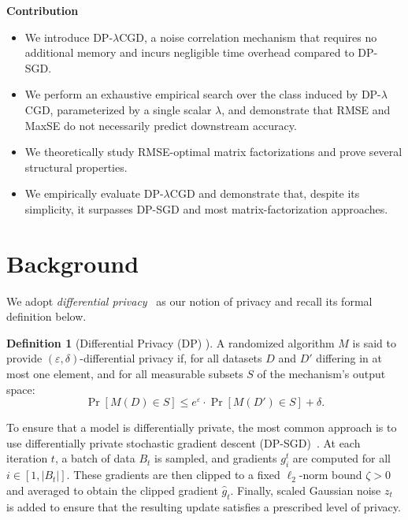\documentclass{article}
\theoremstyle{plain}
\theoremstyle{definition}
\newtheorem{definition}{Definition}   %
\theoremstyle{remark}
\newcommand{\method}{DP-$\lambda$CGD\xspace}
\begin{document}
\textbf{Contribution}

\begin{itemize}[nosep]
    \item We introduce \method, a noise correlation mechanism that requires no additional memory and incurs negligible time overhead compared to DP-SGD.
    \smallskip\item We perform an exhaustive empirical search over the class induced by \method, parameterized by a single scalar $\lambda$, and demonstrate that RMSE and MaxSE do not necessarily predict downstream accuracy.
    \smallskip\item We theoretically study RMSE-optimal matrix factorizations and prove several structural properties.
    \smallskip\item We empirically evaluate \method and demonstrate that, despite its simplicity, it surpasses DP-SGD and most matrix-factorization approaches.
\end{itemize}





\section{Background}



We adopt \emph{differential privacy}~\citep{Dwork_DP_original} as our notion of privacy and recall its formal definition below.


\begin{definition}[Differential Privacy (DP) \citep{Dwork_DP_original}]
A randomized algorithm $M$ is said to provide $(\varepsilon, \delta)$-differential privacy if, for all datasets $D$ and $D'$ differing in at most one element, and for all measurable subsets $S$ of the mechanism's output space:
\begin{equation}
\Pr[M(D) \in S] \leq e^{\varepsilon} \cdot \Pr[M(D') \in S] + \delta.
\end{equation}
\end{definition}



To ensure that a model is differentially private, the most common approach is to use differentially private stochastic gradient descent (DP-SGD)~\citep{Abadi}. At each iteration $t$, a batch of data $B_t$ is sampled, and gradients
$g_i^t$ are computed for all $i \in [1, |B_t|]$. These gradients are then clipped to a fixed
$\ell_2$-norm bound $\zeta > 0$ and averaged to obtain the clipped gradient
$\hat{g}_t$. Finally, scaled Gaussian noise $z_t$ is added to ensure that the resulting
update satisfies a prescribed level of privacy.
\end{document}

